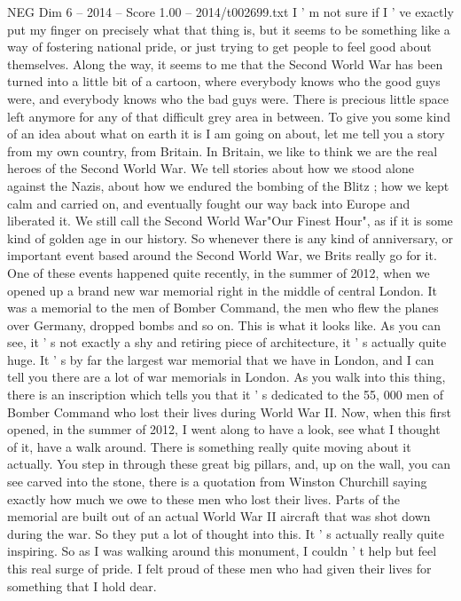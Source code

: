 \begin{textsample}{NEG Dim 6 – 2014 – Score 1.00 – 2014/t002699.txt}
I ' m not sure if I ' ve exactly put my finger on precisely what that thing is, but it seems to be something like a way of fostering national pride, or just trying to get people to feel good about themselves.
Along the way, it seems to me that the Second World War has been turned into a little bit of a cartoon, where everybody knows who the good guys were, and everybody knows who the bad guys were.
There is precious little space left anymore for any of that difficult grey area in between.
To give you some kind of an idea about what on earth it is I am going on about, let me tell you a story from my own country, from Britain.
In Britain, we like to think we are the real heroes of the Second World War.
We tell stories about how we stood alone against the Nazis, about how we endured the bombing of the Blitz ; how we kept calm and carried on, and eventually fought our way back into Europe and liberated it.
We still call the Second World War"Our Finest Hour", as if it is some kind of golden age in our history.
So whenever there is any kind of anniversary, or important event based around the Second World War, we Brits really go for it.
One of these events happened quite recently, in the summer of 2012, when we opened up a brand new war memorial right in the middle of central London.
It was a memorial to the men of Bomber Command, the men who flew the planes over Germany, dropped bombs and so on.
This is what it looks like.
As you can see, it ' s not exactly a shy and retiring piece of architecture, it ' s actually quite huge.
It ' s by far the largest war memorial that we have in London, and I can tell you there are a lot of war memorials in London.
As you walk into this thing, there is an inscription which tells you that it ' s dedicated to the 55, 000 men of Bomber Command who lost their lives during World War II.
Now, when this first opened, in the summer of 2012, I went along to have a look, see what I thought of it, have a walk around.
There is something really quite moving about it actually.
You step in through these great big pillars, and, up on the wall, you can see carved into the stone, there is a quotation from Winston Churchill saying exactly how much we owe to these men who lost their lives.
Parts of the memorial are built out of an actual World War II aircraft that was shot down during the war.
So they put a lot of thought into this.
It ' s actually really quite inspiring.
So as I was walking around this monument, I couldn ' t help but feel this real surge of pride.
I felt proud of these men who had given their lives for something that I hold dear.

\end{textsample}
